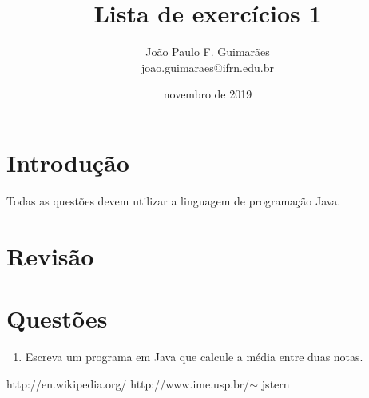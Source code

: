 \documentclass[12pt]{article}
\begin{document}
 

\title{Lista de exercícios 1} 
\author{João Paulo F. Guimarães \\ joao.guimaraes@ifrn.edu.br} 
\date{novembro de 2019} 

\maketitle %

\section{Introdução}

Todas as questões devem utilizar a linguagem de programação Java.

\section{Revisão}



\section{Questões}

\begin{enumerate}

	\item Escreva um programa em Java que calcule a média entre duas notas.



\end{enumerate}



\begin{thebibliography}{99} %
http://en.wikipedia.org/ %
http://www.ime.usp.br/$\sim$ jstern

\end{thebibliography}
\end{document}
